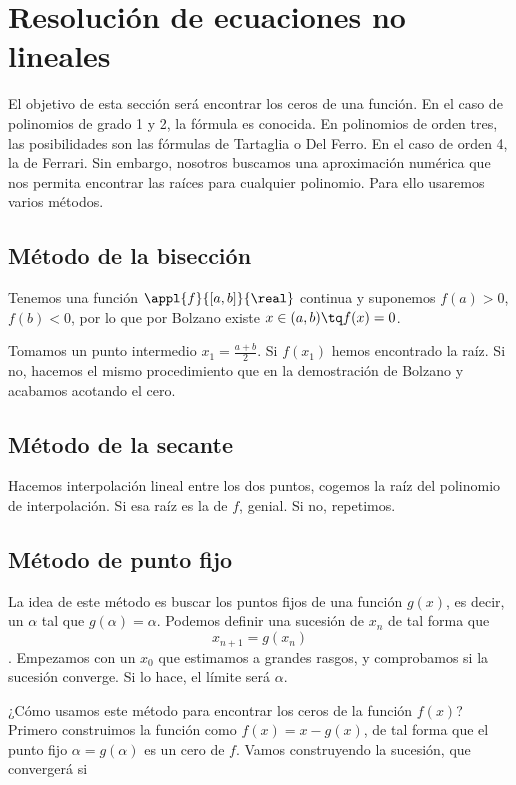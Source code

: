 \documentclass[nochap]{apuntes}
\begin{document}
\section{Resolución de ecuaciones no lineales}

El objetivo de esta sección será encontrar los ceros de una función. En el caso de polinomios de grado 1 y 2, la fórmula es conocida. En polinomios de orden tres, las posibilidades son las fórmulas de Tartaglia o Del Ferro. En el caso de orden 4, la de Ferrari. Sin embargo, nosotros buscamos una aproximación numérica que nos permita encontrar las raíces para cualquier polinomio. Para ello usaremos varios métodos.

\subsection{Método de la bisección}

Tenemos una función $\appl{f}{[a,b]}{\real}$ continua y suponemos  $f(a) > 0$, $f(b) < 0$, por lo que por Bolzano existe $x\in (a,b) \tq f(x) = 0$.

Tomamos un punto intermedio $x_1 = \frac{a+b}{2}$. Si $f(x_1)$ hemos encontrado la raíz. Si no, hacemos el mismo procedimiento que en la demostración de Bolzano y acabamos acotando el cero.

\subsection{Método de la secante}

Hacemos interpolación lineal entre los dos puntos, cogemos la raíz del polinomio de interpolación. Si esa raíz es la de $f$, genial. Si no, repetimos.

\subsection{Método de punto fijo}

La idea de este método es buscar los puntos fijos de una función $g(x)$, es decir, un $\alpha$ tal que $g(\alpha) = \alpha$. Podemos definir una sucesión de $x_n$ de tal forma que \[x_{n+1} = g(x_n) \]. Empezamos con un $x_0$ que estimamos a grandes rasgos, y comprobamos si la sucesión converge. Si lo hace, el límite será $\alpha$. 

¿Cómo usamos este método para encontrar los ceros de la función $f(x)$?  Primero construimos la función como $f(x) = x - g(x)$, de tal forma que el punto fijo $\alpha = g(\alpha)$ es un cero de $f$. Vamos construyendo la sucesión, que convergerá si
\end{document}
